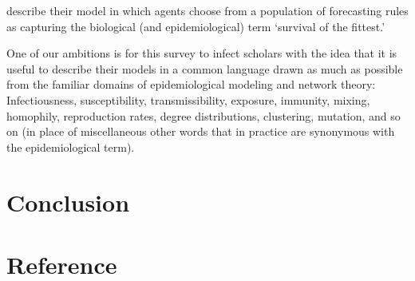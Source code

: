 
\cite{brock1997rational} describe their model in which agents choose from a population of forecasting rules as capturing the biological (and epidemiological) term `survival of the fittest.'  

One of our ambitions is for this survey to infect scholars with the idea that it is useful to describe their models in a common language drawn as much as possible from the familiar domains of epidemiological modeling and network theory:  Infectiousness, susceptibility, transmissibility, exposure, immunity, mixing, homophily, reproduction rates, degree distributions, clustering, mutation, and so on (in place of miscellaneous other words that in practice are synonymous with the epidemiological term).

\hypertarget{conclusion}{}
\section{Conclusion}




\section*{Reference}

\ifInBook{
  
  
}{
  \pagebreak
}
% 

\pagebreak

